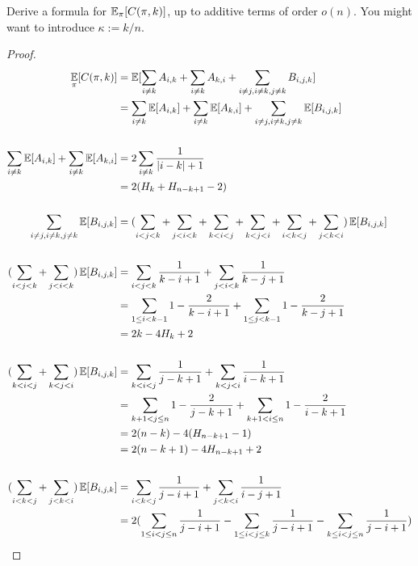 \documentclass[11pt,a4paper,oneside]{article}
\newcommand{\E}{\mathop{\mathbb{E\/}}}
\begin{document}
\begin{problem}{9}
\statement
Derive a formula for $\E_{\pi} [C(\pi,k)]$, up to additive terms of order $o(n)$.
You might want to introduce $\kappa := k/n$.
\begin{proof}
    \[
        \begin{split}
            \E_{\pi} [C(\pi,k)] &= \E[\sum_{i \not= k}A_{i, k} + \sum_{i \not= k}A_{k, i} + \sum_{i \not= j, i \not= k,j \not= k}B_{i, j, k}]\\
            &= \sum_{i \not= k}\E[A_{i, k}] + \sum_{i \not= k}\E[A_{k, i}] + \sum_{i \not= j, i \not= k,j \not= k}\E[B_{i, j, k}]\\\\
            \sum_{i \not= k}\E[A_{i, k}] + \sum_{i \not= k}\E[A_{k, i}] &= 2\sum_{i \not= k}\frac{1}{|i - k| + 1} \\
            &= 2(H_k + H_{n - k + 1} - 2)\\\\
            \sum_{i \not= j, i \not= k,j \not= k}\E[B_{i, j, k}] &= (\sum_{i < j < k} + \sum_{j < i < k} + \sum_{k < i < j} + \sum_{k < j < i} + \sum_{i < k < j} + \sum_{j < k < i}) \E[B_{i, j, k}] \\\\
            (\sum_{i < j < k} + \sum_{j < i < k})\E[B_{i, j, k}] &= \sum_{i < j < k}\frac{1}{k - i + 1} + \sum_{j < i < k}\frac{1}{k - j + 1}\\
            &= \sum_{1 \leq i < k - 1}1 - \frac{2}{k - i + 1} + \sum_{1 \leq j < k - 1} 1 - \frac{2}{k - j + 1}\\
            &= 2k - 4H_k + 2\\\\
            (\sum_{k < i < j} + \sum_{k < j < i})\E[B_{i, j, k}] &= \sum_{k < i < j}\frac{1}{j - k + 1} + \sum_{k < j < i}\frac{1}{i - k + 1}\\
            &= \sum_{k + 1 < j \leq n}1 - \frac{2}{j - k + 1} + \sum_{k + 1 < i \leq n} 1 - \frac{2}{i - k + 1}\\
            &= 2(n - k) - 4(H_{n - k + 1} - 1)\\
            &= 2(n - k + 1) - 4H_{n - k + 1} + 2\\\\
            (\sum_{i < k < j} + \sum_{j < k < i}) \E[B_{i, j, k}] &= \sum_{i < k < j}\frac{1}{j - i + 1} + \sum_{j < k < i}\frac{1}{i - j + 1} \\
            &= 2(\sum_{1 \leq i < j \leq n}\frac{1}{j - i + 1} - \sum_{1 \leq i < j \leq k}\frac{1}{j - i + 1} - \sum_{k \leq i < j \leq n}\frac{1}{j - i + 1})\\

\end{split}\]
\end{proof}
\end{problem}
\end{document}
